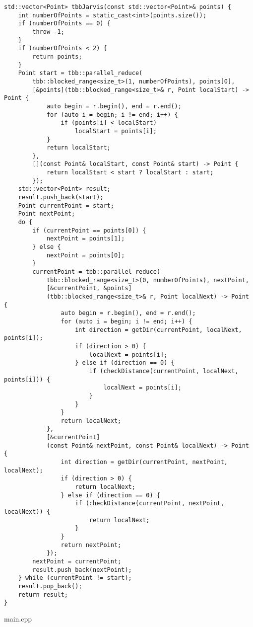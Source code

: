 \documentclass{report}
\begin{document}
\begin{lstlisting}
std::vector<Point> tbbJarvis(const std::vector<Point>& points) {
    int numberOfPoints = static_cast<int>(points.size());
    if (numberOfPoints == 0) {
        throw -1;
    }
    if (numberOfPoints < 2) {
        return points;
    }
    Point start = tbb::parallel_reduce(
        tbb::blocked_range<size_t>(1, numberOfPoints), points[0],
        [&points](tbb::blocked_range<size_t>& r, Point localStart) -> Point {
            auto begin = r.begin(), end = r.end();
            for (auto i = begin; i != end; i++) {
                if (points[i] < localStart)
                    localStart = points[i];
            }
            return localStart;
        },
        [](const Point& localStart, const Point& start) -> Point {
            return localStart < start ? localStart : start;
        });
    std::vector<Point> result;
    result.push_back(start);
    Point currentPoint = start;
    Point nextPoint;
    do {
        if (currentPoint == points[0]) {
            nextPoint = points[1];
        } else {
            nextPoint = points[0];
        }
        currentPoint = tbb::parallel_reduce(
            tbb::blocked_range<size_t>(0, numberOfPoints), nextPoint,
            [&currentPoint, &points]
            (tbb::blocked_range<size_t>& r, Point localNext) -> Point {
                auto begin = r.begin(), end = r.end();
                for (auto i = begin; i != end; i++) {
                    int direction = getDir(currentPoint, localNext, points[i]);
                    if (direction > 0) {
                        localNext = points[i];
                    } else if (direction == 0) {
                        if (checkDistance(currentPoint, localNext, points[i])) {
                            localNext = points[i];
                        }
                    }
                }
                return localNext;
            },
            [&currentPoint]
            (const Point& nextPoint, const Point& localNext) -> Point {
                int direction = getDir(currentPoint, nextPoint, localNext);
                if (direction > 0) {
                    return localNext;
                } else if (direction == 0) {
                    if (checkDistance(currentPoint, nextPoint, localNext)) {
                        return localNext;
                    }
                }
                return nextPoint;
            });
        nextPoint = currentPoint;
        result.push_back(nextPoint);
    } while (currentPoint != start);
    result.pop_back();
    return result;
}
\end{lstlisting}
\par main.cpp
\end{document}
